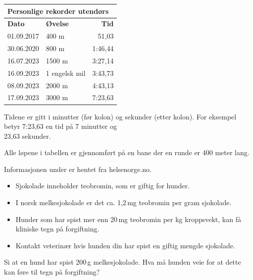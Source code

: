 \begin{center}
	\begin{tabular}{|l|l|r|}
		\hline
		\multicolumn{3}{|l|}{\textbf{Personlige rekorder utendørs}} \\ \hline
		\textbf{Dato} & \textbf{Øvelse} & \textbf{Tid} \\ \hline
		01.09.2017 & 400 m & 51,03 \\ \hline
		30.06.2020 & 800 m & 1:46,44 \\ \hline
		16.07.2023 & 1500 m & 3:27,14 \\ \hline
		16.09.2023 & 1 engelsk mil & 3:43,73 \\ \hline
		08.09.2023 & 2000 m & 4:43,13 \\ \hline
		17.09.2023 & 3000 m & 7:23,63 \\ \hline
	\end{tabular}
\end{center}

\medskip
Tidene er gitt i minutter (før kolon) og sekunder (etter kolon). For
eksempel betyr 7:23,63 en tid på 7 minutter og \\ 23,63 sekunder. \os

Alle løpene i tabellen er gjennomført på en bane der en runde er
400 meter lang.





\newpage
{}
Informasjonen under er hentet fra helsenorge.no.
\begin{itemize}
	\item Sjokolade inneholder teobromin, som er giftig for hunder.
	\item I norsk melkesjokolade er det ca. 1,2\,mg teobromin per gram sjokolade.
	\item Hunder som har spist mer enn 20\,mg teobromin per kg kroppsvekt, kan få
	kliniske tegn på forgiftning.
	\item Kontakt veterinær hvis hunden din har spist en giftig mengde sjokolade.
\end{itemize}
Si at en hund har spist 200\,g melkesjokolade. Hva må hunden veie for at dette kan føre til tegn på forgiftning?

